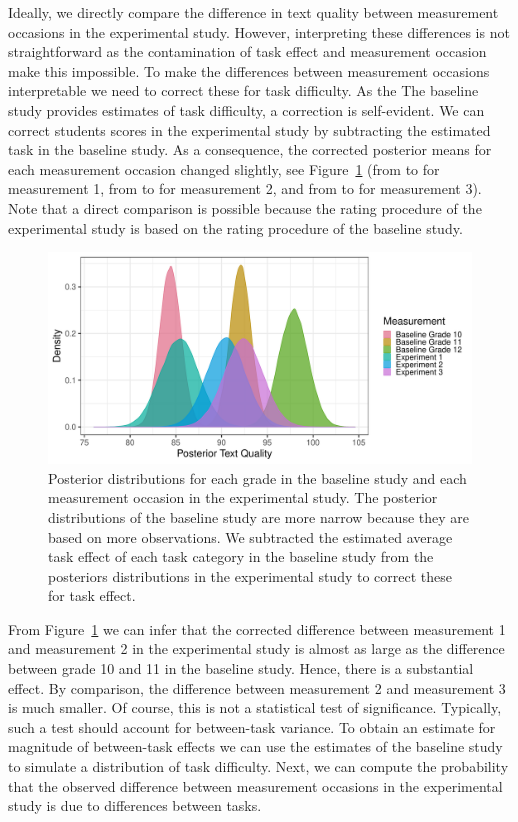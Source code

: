 \documentclass[a4paper]{article}
\newcommand{\getVal}[3]{%
	\pgfplotstablegetelem{#1}{#2}\of{#3}%
	\pgfmathprintnumber{\pgfplotsretval}%
}
\begin{document}
Ideally, we directly compare the difference in text quality between measurement occasions in the experimental study. However, interpreting these differences is not straightforward as the contamination of task effect and measurement occasion make this impossible. To make the differences between measurement occasions interpretable we need to correct these for task difficulty. As the The baseline study provides estimates of task difficulty, a correction is self-evident.  We can correct students scores in the experimental study by subtracting the estimated task in the baseline study. As a consequence, the corrected posterior means for each measurement occasion changed slightly, see Figure~\ref{fig:comparePostTextQual} (from \getVal{0}{Mean}{\tbPostMeansProdCC} to \getVal{3}{Mean}{\tbPostMeansProdCC} for measurement 1, from \getVal{1}{Mean}{\tbPostMeansProdCC} to \getVal{4}{Mean}{\tbPostMeansProdCC} for measurement 2, and from \getVal{2}{Mean}{\tbPostMeansProdCC} to \getVal{5}{Mean}{\tbPostMeansProdCC} for measurement 3). Note that a direct comparison is possible because the rating procedure of the experimental study is based on the rating procedure of the baseline study.
\begin{figure}[!ht]
	\includegraphics[width=\textwidth]{figures/comparePosteriorTextQuality.pdf}
	\caption{Posterior distributions for each grade in the baseline study and each measurement occasion in the experimental study. The posterior distributions of the baseline study are more narrow because they are based on more observations. We subtracted the estimated average task effect of each task category in the baseline study from the posteriors distributions in the experimental study to correct these for task effect.}
	\label{fig:comparePostTextQual}
\end{figure}

From Figure~\ref{fig:comparePostTextQual} we can infer that the corrected difference between measurement 1 and measurement 2 in the experimental study is almost as large as the difference between grade 10 and 11 in the baseline study. Hence, there is a substantial effect. By comparison, the difference between measurement 2 and measurement 3 is much smaller. Of course, this is not a statistical test of significance. Typically, such a test should account for between-task variance. To obtain an estimate for magnitude of between-task effects we can use the estimates of the baseline study to simulate a distribution of task difficulty. Next, we can compute the probability that the observed difference between measurement occasions in the experimental study is due to differences between tasks. 
\end{document}
